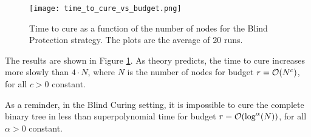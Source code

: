 \begin{figure}[H]
	\centering\texttt{[image: time\_to\_cure\_vs\_budget.png]}
	\caption{Time to cure as a function of the number of nodes for the Blind Protection strategy. The plots are the average of 20 runs.}
	\label{fig:Npower}
\end{figure}

The results are shown in Figure \ref{fig:Npower}. As theory predicts, the time to cure increases more slowly than $4\cdot N$, where $N$ is the number of nodes for budget $r = \mathcal{O}(N^c)$, for all $c>0$ constant. 

As a reminder, in the Blind Curing setting, it is impossible to cure the complete binary tree in less than superpolynomial time for budget $r=\mathcal{O}(\log^\alpha(N))$, for all $\alpha > 0$ constant.

